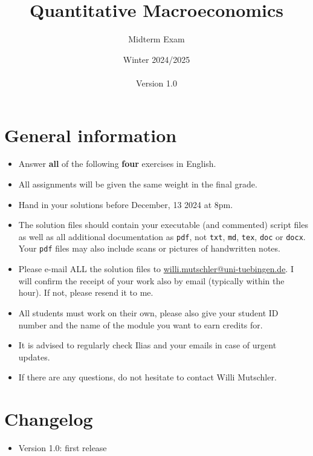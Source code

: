 \documentclass{article}
\begin{document}
	
\title{Quantitative Macroeconomics}
\author{Midterm Exam}
\date{Winter 2024/2025\\~\\Version 1.0}
\maketitle

\section*{General information}
\begin{itemize}
\item Answer \textbf{all} of the following \textbf{four} exercises in English.
\item All assignments will be given the same weight in the final grade.
\item Hand in your solutions before December, 13 2024 at 8pm.
\item The solution files should contain your executable (and commented) script files
  as well as all additional documentation as \texttt{pdf}, not \texttt{txt}, \texttt{md}, \texttt{tex}, \texttt{doc} or \texttt{docx}.
Your \texttt{pdf} files may also include scans or pictures of handwritten notes.
\item Please e-mail ALL the solution files to \url{willi.mutschler@uni-tuebingen.de}.
I will confirm the receipt of your work also by email (typically within the hour). If not, please resend it to me.
\item All students must work on their own, please also give your student ID number and the name of the module you want to earn credits for.
\item It is advised to regularly check Ilias and your emails in case of urgent updates.
\item If there are any questions, do not hesitate to contact Willi Mutschler.
\end{itemize}

\section*{Changelog}
\begin{itemize}
\item Version 1.0: first release
\end{itemize}
\newpage
\end{document}
